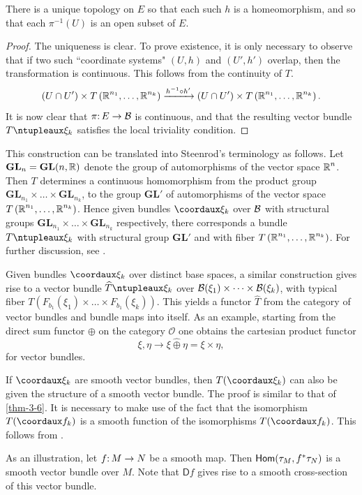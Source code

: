 \begin{assertion*}
	There is a unique topology on $E$ so that each such $h$
	is a homeomorphism, and so that each $\pi^{-1}(U)$ is an open subset of $E$.
\end{assertion*}
\begin{proof}
	The uniqueness is clear. To prove existence, it is only 
	necessary to observe that if two such ``coordinate systems" $(U,h)$ and
	$(U', h')$ overlap, then the transformation is continuous. This follows from the continuity of $T$.
	\[\left(U \cap U^{\prime}\right) \times T\left(\boldsymbol{\mathbb{R}}^{n_{1}}, \ldots, \boldsymbol{\mathbb{R}}^{n_{k}}\right) \xrightarrow{h^{-1} \circ h^{\prime}}\left(U \cap U^{\prime}\right) \times T\left(\boldsymbol{\mathbb{R}}^{n_{1}}, \ldots, \boldsymbol{\mathbb{R}}^{n_{k}}\right).\]
	It is now clear that $\pi\mathpunct{:} E \to \mathcal{B}$ is continuous, and that the resulting
	vector bundle $T\ntuple{\xi_k}$ satisfies the local triviality condition.
\end{proof}
\begin{remark}
	This construction can be translated into Steenrod's
	terminology as follows. Let $	\mathbf{GL}_n =
	\mathbf{GL}(n,\boldsymbol{\mathbb{R}})$ denote the group of 
	automorphisms of the vector space $\boldsymbol{\mathbb{R}}^n$. Then $T$ determines a continuous homomorphism from the product group $\mathbf{GL}_{n_1}\times\dots\times\mathbf{GL}_{n_k}$, to the group $\mathbf{GL}'$ of
	automorphisms of the vector space $T\left(\boldsymbol{\mathbb{R}}^{n_{1}}, \ldots, \boldsymbol{\mathbb{R}}^{n_{k}}\right)$. Hence given bundles
	$\coord{\xi_k}$ over $\mathcal{B}$ with structural groups $\mathbf{GL}_{n_1}\times\dots\times\mathbf{GL}_{n_k}$ respectively,
	there corresponds a bundle $T\ntuple{\xi_k}$ with structural group $\mathbf{GL}'$ and
	 with fiber $T\left(\boldsymbol{\mathbb{R}}^{n_{1}}, \ldots, \boldsymbol{\mathbb{R}}^{n_{k}}\right)$. For further discussion, see \cite[\S~3.6]{44}.
\end{remark}
\begin{remark}
	Given bundles $\coord{\xi_k}$ over distinct base spaces, a
	similar construction gives rise to a vector bundle $\widehat{T}\ntuple{\xi_k}$ over
	$\mathcal{B}(\xi_1)\times\dots\times\mathcal{B}(\xi_k)$, with typical fiber
		$T\left(F_{b_1}(\xi_1)\times\dots\times F_{b_1}(\xi_k)\right)$. This
	yields a functor $\widehat{T}$ from the category of vector bundles and bundle maps
	into itself. As an example, starting from the direct sum functor $\oplus$ on the
	category $\mathcal{O}$ one obtains the cartesian product functor
	\[\xi, \eta \longrightarrow \xi \widehat{\oplus} \eta=\xi \times \eta,\]
	for vector bundles.
\end{remark}

\begin{remark}
	If $\coord{\xi_k}$ are smooth vector bundles, then $T(\coord{\xi_k})$
	can also be given the structure of a smooth vector bundle. The proof is
	similar to that of \cref{thm-3-6}. It is necessary to make use of the fact that the 
	isomorphism $T(\coord{f_k})$ is a smooth function of the isomorphisms $T(\coord{f_k})$.
	This follows from \cite[p.~128]{47}.
\end{remark}
As an illustration, let $\map{f}{M}{N}$ be a smooth map. Then $\mathsf{Hom}(\tau_M,f^*\tau_N)$
is a smooth vector bundle over $M$. Note that $\mathsf{D}f$ gives rise to a smooth
cross-section of this vector bundle.

